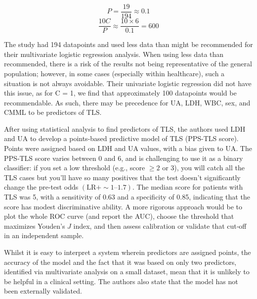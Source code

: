 \documentclass{article}
\begin{document}
\[P = \frac{19}{194} \approx 0.1 \]
\[\frac{10C}{P} \approx \frac{10 \times 6}{0.1} = 600\]

The study had 194 datapoints and used less data than might be recommended for their multivariate logistic regression analysis. When using less data than recommended, there is a risk of the results not being representative of the general population; however, in some cases (especially within healthcare), such a situation is not always avoidable. Their univariate logistic regression did not have this issue, as for C = 1, we find that approximately 100 datapoints would be recommendable. As such, there may be precedence for UA, LDH, WBC,  sex, and CMML to be predictors of TLS.

After using statistical analysis to find predictors of TLS, the authors used LDH and UA to develop a points-based predictive model of TLS (PPS-TLS score). Points were assigned based on LDH and UA values, with a bias given to UA. The PPS‑TLS score varies between 0 and 6, and is challenging to use it as a binary classifier: if you set a low threshold (e.g., score \(\ge 2\) or 3), you will catch all the TLS cases but you’ll have so many positives that the test doesn’t significantly change the pre‑test odds \((\mathrm{LR}+ \sim1 \text{--}1.7)\). The median score for patients with TLS was 5, with a sensitivity of 0.63 and a specificity of 0.85, indicating that the score has modest discriminative ability. 
A more rigorous approach would be to plot the whole ROC curve (and report the AUC), choose the threshold that maximizes Youden’s \(J\) index, and then assess calibration or validate that cut‑off in an independent sample.

Whilst it is easy to interpret a system wherein predictors are assigned points, the accuracy of the model and the fact that it was based on only two predictors, identified via multivariate analysis on a small dataset, mean that it is unlikely to be helpful in a clinical setting. The authors also state that the model has not been externally validated. 
\end{document}
